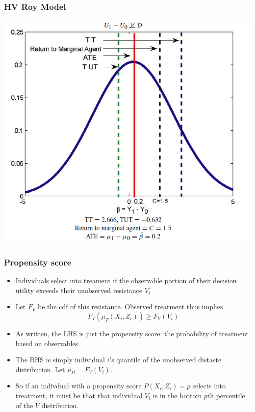 \begin{frame}
  \frametitle{HV Roy Model}
  \begin{center}
    \includegraphics[width=.85\textwidth]{./resources/HVRoyDist}
  \end{center}  
\end{frame}

\begin{frame}
  \frametitle{Propensity score}
  \begin{itemize}
    \item Individuals select into treament if the observable portion of their decision utility exceeds their unobserved resistance $V_i$
    \item Let $F_V$ be the cdf of this resistance. Observed treatment thus implies 
    $$ F_V(\mu_T(X_i,Z_i)) \ge F_V(V_i)$$ 
    \item As written, the LHS is just the \alert{propensity score}: the probability of treatment based on observables. 
    \item The RHS is simply individual $i$'s quantile of the unobserved distaste distribution. Let $u_{si} = F_V(V_i)$. 
    \item So if an indivdual with a propensity score $P(X_i,Z_i)=p$ selects into treatment, it must be that that individual $V_i$ is in the bottom $p$th percentile of the $V$ distribution. 
  \end{itemize}
\end{frame}

